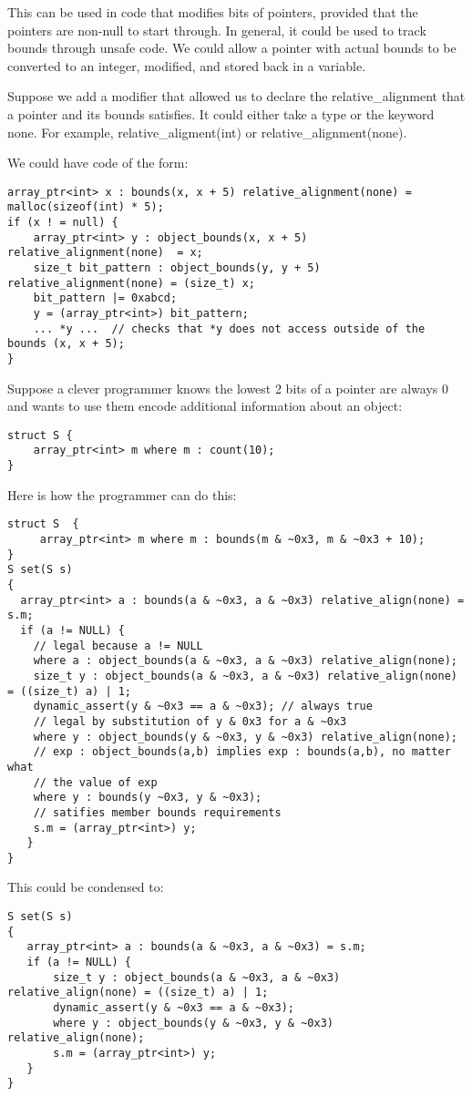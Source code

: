 This can be used in code that modifies bits of pointers, provided that
the pointers are non-null to start through. In general, it could be used
to track bounds through unsafe code. We could allow a pointer with
actual bounds to be converted to an integer, modified, and stored back
in a variable.

Suppose we add a modifier that allowed us to declare the
relative\_alignment that a pointer and its bounds satisfies. It could
either take a type or the keyword none. For example,
relative\_aligment(int) or relative\_alignment(none).

We could have code of the form:

\begin{verbatim}
array_ptr<int> x : bounds(x, x + 5) relative_alignment(none) = malloc(sizeof(int) * 5);
if (x ! = null) {
    array_ptr<int> y : object_bounds(x, x + 5) relative_alignment(none)  = x;
    size_t bit_pattern : object_bounds(y, y + 5) relative_alignment(none) = (size_t) x;
    bit_pattern |= 0xabcd;
    y = (array_ptr<int>) bit_pattern;
    ... *y ...  // checks that *y does not access outside of the bounds (x, x + 5);
}
\end{verbatim}

Suppose a clever programmer knows the lowest 2 bits of a pointer are
always 0 and wants to use them encode additional information about an
object:
\begin{verbatim}
struct S {
    array_ptr<int> m where m : count(10);
}
\end{verbatim}

Here is how the programmer can do this:
\begin{verbatim}
struct S  {
     array_ptr<int> m where m : bounds(m & ~0x3, m & ~0x3 + 10);
}
S set(S s) 
{
  array_ptr<int> a : bounds(a & ~0x3, a & ~0x3) relative_align(none) = s.m;
  if (a != NULL) {
    // legal because a != NULL
    where a : object_bounds(a & ~0x3, a & ~0x3) relative_align(none);
    size_t y : object_bounds(a & ~0x3, a & ~0x3) relative_align(none) = ((size_t) a) | 1;
    dynamic_assert(y & ~0x3 == a & ~0x3); // always true
    // legal by substitution of y & 0x3 for a & ~0x3
    where y : object_bounds(y & ~0x3, y & ~0x3) relative_align(none);
    // exp : object_bounds(a,b) implies exp : bounds(a,b), no matter what
    // the value of exp
    where y : bounds(y ~0x3, y & ~0x3);
    // satifies member bounds requirements
    s.m = (array_ptr<int>) y;
   }
}
\end{verbatim}

This could be condensed to:
\begin{verbatim}
S set(S s) 
{
   array_ptr<int> a : bounds(a & ~0x3, a & ~0x3) = s.m;
   if (a != NULL) {
       size_t y : object_bounds(a & ~0x3, a & ~0x3) relative_align(none) = ((size_t) a) | 1;
       dynamic_assert(y & ~0x3 == a & ~0x3);
       where y : object_bounds(y & ~0x3, y & ~0x3) relative_align(none);
       s.m = (array_ptr<int>) y;
   }
} 
\end{verbatim}

